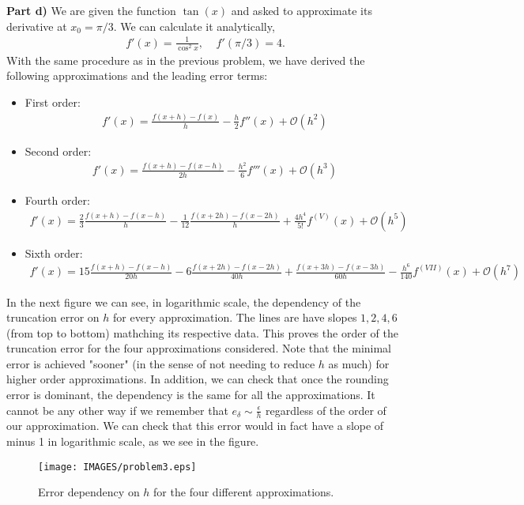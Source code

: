 \begin{solution}
\textbf{Part d)} We are given the function $\tan{(x)}$ and asked to approximate its derivative at $x_0=\pi/3$. We can calculate it analytically,
\begin{align*}
f'(x)=\frac{1}{\cos^2{x}},~~~~~f'(\pi/3)=4.
\end{align*}
With the same procedure as in the previous problem, we have derived the following approximations and the leading error terms:
\begin{itemize}
\item First order:
\begin{align*}
f'(x)=\frac{f(x+h)-f(x)}{h}-\frac{h}{2}f''(x)+\mathcal{O}(h^2)
\end{align*}
\item Second order:
\begin{align*}
f'(x)=\frac{f(x+h)-f(x-h)}{2h}-\frac{h^2}{6}f'''(x)+\mathcal{O}(h^3)
\end{align*}
\item Fourth order:
\begin{align*}
f'(x)=\frac{2}{3}\frac{f(x+h)-f(x-h)}{h}-\frac{1}{12}\frac{f(x+2h)-f(x-2h)}{h}+\frac{4h^4}{5!}f^{(V)}(x)+\mathcal{O}(h^5)
\end{align*}
\item Sixth order:
\begin{align*}
f'(x)=15\frac{f(x+h)-f(x-h)}{20h}-6\frac{f(x+2h)-f(x-2h)}{40h}+\frac{f(x+3h)-f(x-3h)}{60h}-\frac{h^6}{140}f^{(VII)}(x)+\mathcal{O}(h^7)
\end{align*}
\end{itemize}
In the next figure we can see, in logarithmic scale, the dependency of the truncation error on $h$ for every approximation. The lines are have slopes $1,2,4,6$ (from top to bottom) mathching its respective data. This proves the order of the truncation error for the four approximations considered. Note that the minimal error is achieved "sooner" (in the sense of not needing to reduce $h$ as much) for higher order approximations. In addition, we can check that once the rounding error is dominant, the dependency is the same for all the approximations. It cannot be any other way if we remember that $e_{\delta}\sim\frac{\epsilon}{h}$ regardless of the order of our approximation. We can check that this error would in fact have a slope of minus 1 in logarithmic scale, as we see in the figure.
\begin{figure}[H]
\centering     %
{\texttt{[image: IMAGES/problem3.eps]}}
\caption{Error dependency on $h$ for the four different approximations.}
\end{figure}

\end{solution}

